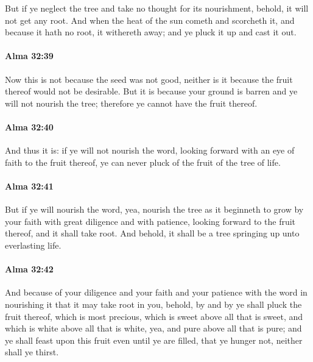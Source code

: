 			But if ye neglect the tree and take no thought for its nourishment,
			behold, it will not get any root.
			And when the heat of the sun cometh and scorcheth it,
			and because it hath no root, it withereth away;
			and ye pluck it up and cast it out.

		\paragraph{Alma 32:39} %
			\label{ALMA-32-39}

			Now this is not because the seed was not good,
			neither is it because the fruit thereof would not be desirable.
			But it is because your ground is barren and ye will not nourish the tree;
			therefore ye cannot have the fruit thereof.

		\paragraph{Alma 32:40} %
			\label{ALMA-32-40}

			And thus it is: if ye will not nourish the word,
			looking forward with an eye of faith to the fruit thereof,
			ye can never pluck of the fruit of the tree of life.

		\paragraph{Alma 32:41} %
			\label{ALMA-32-41}

			But if ye will nourish the word,
			yea, nourish the tree as it beginneth to grow by your faith
			with great diligence and with patience,
			looking forward to the fruit thereof,
			and it shall take root.
			And behold, it shall be a tree springing up unto everlasting life.

		\paragraph{Alma 32:42} %
			\label{ALMA-32-42}

			And because of your diligence and your faith and your patience with the word
			in nourishing it that it may take root in you,
			behold, by and by ye shall pluck the fruit thereof, which is most precious,
			which is sweet above all that is sweet,
			and which is white above all that is white,
			yea, and pure above all that is pure;
			and ye shall feast upon this fruit even until ye are filled,
			that ye hunger not, neither shall ye thirst.


